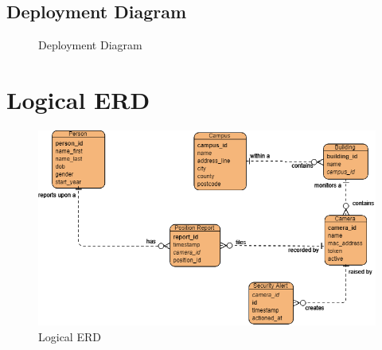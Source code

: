 \documentclass[
  english,
  a4paper,
,tablecaptionabove
]{scrartcl}
\begin{document}
\newpage

\begin{landscape}

\pagestyle{empty}

\hypertarget{deployment-diagram}{%
\section{Deployment Diagram}\label{deployment-diagram}}

\begin{figure}
    \caption{Deployment Diagram} \label{fig:deployment-diagram}
\end{figure}

\end{landscape}

\newpage

\hypertarget{logical-erd}{%
\section{Logical ERD}\label{logical-erd}}

\begin{figure}
\centering
\includegraphics{images/ppm-images/logical-erd.png}
\caption{Logical ERD}
\end{figure}
\end{document}
